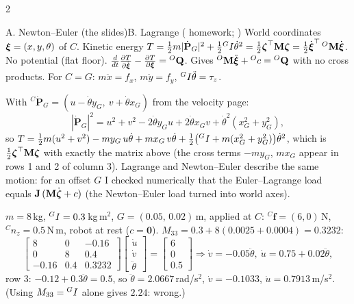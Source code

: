 \begin{multicols}{2}
\begin{twoway}{A. Newton--Euler (the slides)}{B. Lagrange ( homework; \added)}
\tcblower
World coordinates $\boldsymbol\xi=(x,y,\theta)$ of $C$. Kinetic energy $T=\tfrac12m|\dot{\mathbf P}_G|^2+\tfrac12{}^{G}I\dot\theta^2=\tfrac12\boldsymbol\zeta^\top\mathbf M\boldsymbol\zeta=\tfrac12\dot{\boldsymbol\xi}^\top\,{}^O\mathbf M\dot{\boldsymbol\xi}$. No potential (flat floor). $\frac{d}{dt}\frac{\partial T}{\partial\dot{\boldsymbol\xi}}-\frac{\partial T}{\partial\boldsymbol\xi}={}^{O}\mathbf Q$. Gives ${}^O\mathbf M\ddot{\boldsymbol\xi}+{}^Oc={}^{O}\mathbf Q$ with no cross products. For $C=G$: $m\ddot x=f_x$, $m\ddot y=f_y$, ${}^{G}I\ddot\theta=\tau_z$.
\end{twoway}
\begin{deriv}
With ${}^C\dot{\mathbf P}_G=(u-\dot\theta y_G,\ v+\dot\theta x_G)$ from the velocity page:
\[|\dot{\mathbf P}_G|^2=u^2+v^2-2\dot\theta y_Gu+2\dot\theta x_Gv+\dot\theta^2(x_G^2+y_G^2),\]
so $T=\tfrac12m(u^2+v^2)-my_G\,u\dot\theta+mx_G\,v\dot\theta+\tfrac12\big({}^{G}I+m(x_G^2+y_G^2)\big)\dot\theta^2$, which is $\tfrac12\boldsymbol\zeta^\top\mathbf M\boldsymbol\zeta$ with exactly the matrix above (the cross terms $-my_G$, $mx_G$ appear in rows 1 and 2 of column 3). Lagrange and Newton--Euler describe the same motion: for an offset $G$ I checked numerically that the Euler--Lagrange load equals $\mathbf J\,(\mathbf M\dot{\boldsymbol\zeta}+c)$ (the Newton--Euler load turned into world axes). \chk
\end{deriv}
\begin{worked}
$m=8$\,kg, ${}^{G}I=0.3$\,kg\,m$^2$, $G=(0.05,\,0.02)$\,m, applied at $C$: ${}^C\mathbf f=(6,0)$\,N, ${}^Cn_z=0.5$\,N\,m, robot at rest ($c=\mathbf 0$). $M_{33}=0.3+8(0.0025+0.0004)=0.3232$:
\[\begin{bmatrix}8&0&-0.16\\0&8&0.4\\-0.16&0.4&0.3232\end{bmatrix}\begin{bmatrix}\dot u\\\dot v\\\ddot\theta\end{bmatrix}=\begin{bmatrix}6\\0\\0.5\end{bmatrix}\Rightarrow
\dot v=-0.05\ddot\theta,\ \dot u=0.75+0.02\ddot\theta,\]
row 3: $-0.12+0.3\ddot\theta=0.5$, so $\ddot\theta=\mathbf{2.0667}$\,rad/s$^2$, $\dot v=\mathbf{-0.1033}$, $\dot u=\mathbf{0.7913}$\,m/s$^2$. (Using $M_{33}={}^{G}I$ alone gives $2.24$: wrong.) \chk
\end{worked}


\end{multicols}
